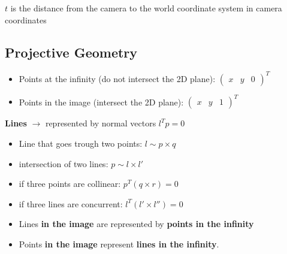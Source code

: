 \alert{$t$ is the distance from the camera to the world coordinate
system in camera coordinates}

\subsection*{Projective Geometry}
\begin{itemize}
  \item Points at the infinity (do not intersect the 2D plane): $\begin{pmatrix} x & y & 0
    \end{pmatrix}^T$
    \item Points in the image (intersect the 2D plane): $\begin{pmatrix} x & y & 1
    \end{pmatrix}^T$
\end{itemize}

\textbf{Lines}
$\rightarrow$ represented by normal vectors 
$l^T p = 0$

\begin{itemize}
 \item Line that goes trough two points:
$l \sim p \times q$
\item intersection of two lines:
$p \sim l \times l'$
\item
if three points are collinear:
$p^T (q \times r) = 0$
\item if three lines are concurrent:
$l^T (l' \times l'') = 0$
\end{itemize}

\begin{itemize}
  \item Lines \textbf{in the image} are represented by \textbf{points in
    the infinity}
  \item Points \textbf{in the image} represent \textbf{lines in the
    infinity}.
\end{itemize}
